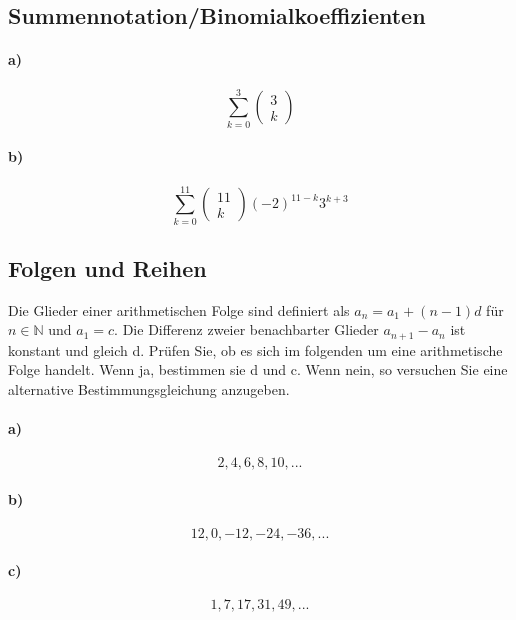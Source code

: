 \documentclass[paper=a4, fontsize=11pt]{scrartcl}
\numberwithin{equation}{section}
\numberwithin{figure}{section}
\numberwithin{table}{section}
\begin{document}
\subsection{Summennotation/Binomialkoeffizienten}
\paragraph{a)}
$$\sum^{3}_{k=0} \left(\begin{array}{c} 3 \\ k \end{array}\right)$$

\paragraph{b)}
$$\sum^{11}_{k=0} \left(\begin{array}{c} 11 \\ k \end{array}\right) (-2)^{11-k} 3^{k+3}$$

\subsection{Folgen und Reihen}
Die Glieder einer arithmetischen Folge sind definiert als $a_{n}=a_{1}+(n-1)d$ für $n \in \mathbb{N}$ und $a_{1}=c$. Die Differenz zweier benachbarter Glieder $a_{n+1}-a_{n}$ ist konstant und gleich d. Prüfen Sie, ob es sich im folgenden um eine arithmetische Folge handelt. Wenn ja, bestimmen sie d und c. Wenn nein, so versuchen Sie eine alternative Bestimmungsgleichung anzugeben.
\paragraph{a)}
$$2,4,6,8,10,...$$

\paragraph{b)}
$$12,0,-12,-24,-36,...$$

\paragraph{c)}
$$1,7,17,31,49,...$$
\end{document}
